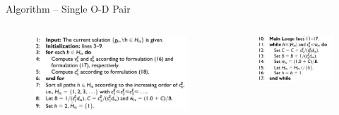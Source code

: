 \documentclass{beamer}
\begin{document}
\begin{frame}{Algorithm -- Single O-D Pair}
\begin{columns}
    \begin{column}{0.4\textwidth}
    \begin{figure}
    \includegraphics[width=\textwidth]{./alg11.jpg}
    \end{figure}
    \end{column}

    \begin{column}{0.2\textwidth}
    \begin{figure}
    \includegraphics[width=\textwidth]{./alg12.jpg}
    \end{figure}
    \end{column}


\end{columns}
\end{frame}
\end{document}

